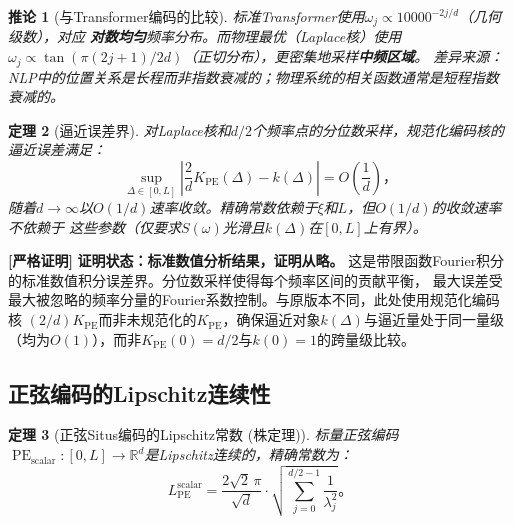 \documentclass[11pt,a4paper]{article}
\newtheorem{theorem}{定理}[section]
\newtheorem{corollary}[theorem]{推论}
\theoremstyle{remark}
\DeclareMathOperator{\PE}{PE}
\newcommand{\R}{\mathbb{R}}
\newcommand{\rigorous}{\textnormal{\textbf{[严格证明]}}}
\begin{document}
\begin{corollary}[与Transformer编码的比较]
\label{cor:1.2.2}
标准Transformer使用$\omega_j \propto 10000^{-2j/d}$（几何级数），对应
\textbf{对数均匀}频率分布。而物理最优（Laplace核）使用
$\omega_j \propto \tan(\pi(2j+1)/2d)$（正切分布），更密集地采样\textbf{中频区域}。
差异来源：NLP中的位置关系是长程而非指数衰减的；物理系统的相关函数通常是短程指数衰减的。
\end{corollary}

\begin{theorem}[逼近误差界]
\label{thm:1.2.2}
对Laplace核和$d/2$个频率点的分位数采样，规范化编码核的逼近误差满足：
\begin{equation}
    \boxed{
    \sup_{\Delta \in [0, L]} \left|\frac{2}{d}K_{\PE}(\Delta) - k(\Delta)\right|
    = O\!\left(\frac{1}{d}\right)
    }，
\end{equation}
随着$d \to \infty$以$O(1/d)$速率收敛。精确常数依赖于$\xi$和$L$，但$O(1/d)$的收敛速率不依赖于
这些参数（仅要求$S(\omega)$光滑且$k(\Delta)$在$[0,L]$上有界）。
\end{theorem}

\rigorous{} \textbf{证明状态：标准数值分析结果，证明从略。}
这是带限函数Fourier积分的标准数值积分误差界。分位数采样使得每个频率区间的贡献平衡，
最大误差受最大被忽略的频率分量的Fourier系数控制。与原版本不同，此处使用规范化编码核
$(2/d)K_{\PE}$而非未规范化的$K_{\PE}$，确保逼近对象$k(\Delta)$与逼近量处于同一量级
（均为$O(1)$），而非$K_{\PE}(0)=d/2$与$k(0)=1$的跨量级比较。

\subsection{正弦编码的Lipschitz连续性}

\begin{theorem}[正弦Situs编码的Lipschitz常数 (株定理)]
\label{thm:1.2.3}
标量正弦编码$\PE_{\text{scalar}}: [0, L] \to \R^d$是Lipschitz连续的，精确常数为：
\begin{equation}
    \boxed{
    L_{\PE}^{\text{scalar}} = \frac{2\sqrt{2}\,\pi}{\sqrt{d}} \cdot \sqrt{\sum_{j=0}^{d/2-1}\frac{1}{\lambda_j^2}}
    }。
\end{equation}
\end{theorem}
\end{document}

